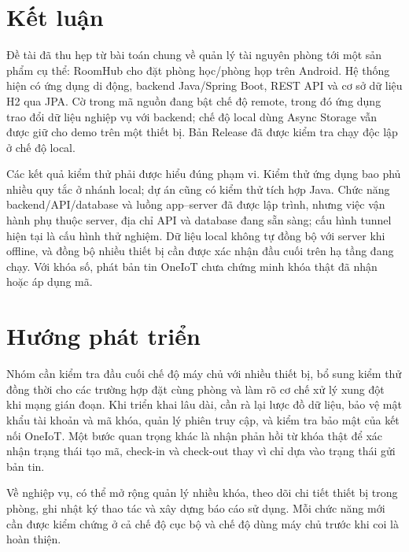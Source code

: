 \documentclass[../DoAn.tex]{subfiles}
\begin{document}
\section{Kết luận}
Đề tài đã thu hẹp từ bài toán chung về quản lý tài nguyên phòng tới một sản phẩm cụ thể: RoomHub cho đặt phòng học/phòng họp trên Android. Hệ thống hiện có ứng dụng di động, backend Java/Spring Boot, REST API và cơ sở dữ liệu H2 qua JPA. Cờ trong mã nguồn đang bật chế độ remote, trong đó ứng dụng trao đổi dữ liệu nghiệp vụ với backend; chế độ local dùng Async Storage vẫn được giữ cho demo trên một thiết bị. Bản Release đã được kiểm tra chạy độc lập ở chế độ local.

Các kết quả kiểm thử phải được hiểu đúng phạm vi. Kiểm thử ứng dụng bao phủ nhiều quy tắc ở nhánh local; dự án cũng có kiểm thử tích hợp Java. Chức năng backend/API/database và luồng app–server đã được lập trình, nhưng việc vận hành phụ thuộc server, địa chỉ API và database đang sẵn sàng; cấu hình tunnel hiện tại là cấu hình thử nghiệm. Dữ liệu local không tự đồng bộ với server khi offline, và đồng bộ nhiều thiết bị cần được xác nhận đầu cuối trên hạ tầng đang chạy. Với khóa số, phát bản tin OneIoT chưa chứng minh khóa thật đã nhận hoặc áp dụng mã.

\section{Hướng phát triển}
Nhóm cần kiểm tra đầu cuối chế độ máy chủ với nhiều thiết bị, bổ sung kiểm thử đồng thời cho các trường hợp đặt cùng phòng và làm rõ cơ chế xử lý xung đột khi mạng gián đoạn. Khi triển khai lâu dài, cần rà lại lược đồ dữ liệu, bảo vệ mật khẩu tài khoản và mã khóa, quản lý phiên truy cập, và kiểm tra bảo mật của kết nối OneIoT. Một bước quan trọng khác là nhận phản hồi từ khóa thật để xác nhận trạng thái tạo mã, check-in và check-out thay vì chỉ dựa vào trạng thái gửi bản tin.

Về nghiệp vụ, có thể mở rộng quản lý nhiều khóa, theo dõi chi tiết thiết bị trong phòng, ghi nhật ký thao tác và xây dựng báo cáo sử dụng. Mỗi chức năng mới cần được kiểm chứng ở cả chế độ cục bộ và chế độ dùng máy chủ trước khi coi là hoàn thiện.
\end{document}
